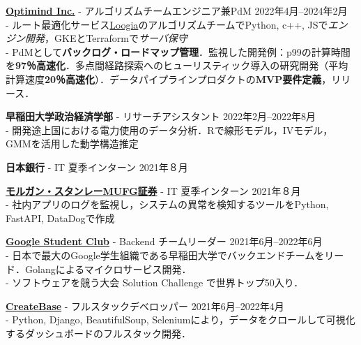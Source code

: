 \documentclass[uplatex,dvipdfmx,a4paper,11pt]{jsarticle}
\begin{document}
{\bf \href{https://www.optimind.tech/}{Optimind Inc.}} { - アルゴリズムチームエンジニア兼PdM} \hfill {2022年4月--2024年2月} 
\\- ルート最適化サービス\href{https://loogia.jp/?_ga=2.72237267.1726635224.1669133714-1962149220.1665458028}{Loogia}のアルゴリズムチームでPython, c++, JSで\emph{エンジン開発}，GKEとTerraformで\emph{サーバ保守}
\\- PdMとして\textbf{バックログ・ロードマップ管理}．監視した開発例：p99の計算時間を\textbf{97％高速化}．多点間経路探索へのヒューリスティック導入の研究開発（平均計算速度\textbf{20％高速化}）．データパイプラインプロダクトの\textbf{MVP要件定義}，リリース．

{ \bf\textcolor{blue(pigment)}{早稲田大学政治経済学部}} { - リサーチアシスタント} \hfill {2022年2月--2022年8月} 
\\- 開発途上国における電力使用のデータ分析．Rで線形モデル，IVモデル，GMMを活用した動学構造推定

{\bf\textcolor{blue(pigment)}{日本銀行}}{ - IT 夏季インターン} \hfill { 2021年８月} 

{\bf \href{https://www.morganstanley.co.jp/ja}{モルガン・スタンレーMUFG証券}}{ - IT 夏季インターン} \hfill {2021年８月} 
\\- 社内アプリのログを監視し，システムの異常を検知するツールをPython, FastAPI, DataDogで作成

{ \bf\href{https://gdsc.community.dev/waseda-university/}{Google Student Club}} { - Backend チームリーダー} \hfill {2021年6月--2022年6月} 
\\- 日本で最大のGoogle学生組織である早稲田大学でバックエンドチームをリード．Golangによるマイクロサービス開発．
\\- ソフトウェアを競う大会 Solution Challenge で世界トップ50入り．

{\bf \href{https://createbase.work/}{CreateBase}} { - フルスタックデベロッパー} \hfill {2021年6月--2022年4月} 
\\- Python, Django, BeautifulSoup, Seleniumにより，データをクロールして可視化するダッシュボードのフルスタック開発．
\end{document}
